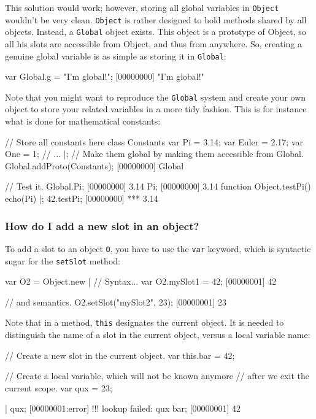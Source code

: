 This solution would work; however, storing all global variables in
\lstinline|Object| wouldn't be very clean. \lstinline|Object| is
rather designed to hold methods shared by all objects. Instead, a
\lstinline|Global| object exists. This object is a prototype of
Object, so all his slots are accessible from Object, and thus from
anywhere. So, creating a genuine global variable is as simple as
storing it in \lstinline|Global|:

\begin{urbiscript}
var Global.g = "I'm global!";
[00000000] "I'm global!"
\end{urbiscript}

Note that you might want to reproduce the \lstinline|Global| system
and create your own object to store your related variables in a more
tidy fashion. This is for instance what is done for mathematical
constants:

\begin{urbiscript}
// Store all constants here
class Constants
{
  var Pi = 3.14;
  var Euler = 2.17;
  var One = 1;
  // ...
}|;
// Make them global by making them accessible from Global.
Global.addProto(Constants);
[00000000] Global

// Test it.
Global.Pi;
[00000000] 3.14
Pi;
[00000000] 3.14
function Object.testPi() { echo(Pi) }|;
42.testPi;
[00000000] *** 3.14
\end{urbiscript}

\subsubsection{How do I add a new slot in an object?}
To add a slot to an object \lstinline{O}, you have to use the
\lstinline{var} keyword, which is syntactic sugar for the
\lstinline{setSlot} method:

\begin{urbiscript}
var O2 = Object.new |
// Syntax...
var O2.mySlot1 = 42;
[00000001] 42

// and semantics.
O2.setSlot("mySlot2", 23);
[00000001] 23
\end{urbiscript}

Note that in a method, \lstinline{this} designates the current
object.  It is needed to distinguish the name of a slot in the current
object, versus a local variable name:

\begin{urbiscript}
{
  // Create a new slot in the current object.
  var this.bar = 42;

  // Create a local variable, which will not be known anymore
  // after we exit the current scope.
  var qux = 23;
}|
qux;
[00000001:error] !!! lookup failed: qux
bar;
[00000001] 42
\end{urbiscript}


